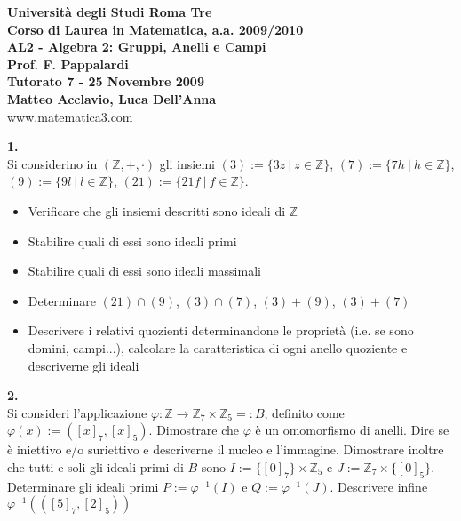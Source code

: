 \documentclass[italian,a4paper,11pt]
{article}
\newcommand{\Z}{\mathbb Z}
\newcommand{\acc}{\`}
\begin{document}
\begin{center}

\textbf{Universit\`a degli Studi Roma Tre}\\

\textbf{Corso di Laurea in Matematica, a.a. 2009/2010}\\

\textbf{AL2 - Algebra 2: Gruppi, Anelli e Campi}\\

\textbf{Prof. F. Pappalardi}\\

\textbf{Tutorato 7 - 25 Novembre 2009}\\

\textbf{Matteo Acclavio, Luca Dell'Anna}\\

www.matematica3.com\\
\end{center}



\vspace{0.4cm}

\vspace{0.4 cm}
\noindent
\begin{Ex}\textbf{ 1.}\\
Si considerino in $(\Z,+,\cdot)$ gli insiemi $(3):=\{3z \ | \ z\in\Z\}$, $(7):=\{7h \ | \ h\in\Z\}$, $(9):=\{9l \ | \ l\in\Z\}$, $(21):=\{21f \ | \ f\in\Z\}$. 
\begin{itemize}
\item  Verificare che gli insiemi descritti sono ideali di $\Z$
\item Stabilire quali di essi sono ideali primi
\item Stabilire quali di essi sono ideali massimali
\item Determinare $(21)\cap(9)$, $(3)\cap(7)$, $(3)+(9)$, $(3)+(7)$
\item Descrivere i relativi quozienti determinandone le propriet\acc a (i.e. se sono domini, campi...), calcolare la caratteristica di ogni anello quoziente e descriverne gli ideali
\end{itemize}
\end{Ex}

\vspace{0.4 cm}
\noindent
\begin{Ex}\textbf{ 2.}\\
Si consideri l'applicazione $\varphi:\Z\longrightarrow \Z_7\times\Z_5=:B$,  definito come $\varphi(x):=([x]_7,[x]_5)$. Dimostrare che $\varphi$ \acc e un omomorfismo di anelli. Dire se \acc e iniettivo e/o suriettivo e descriverne il nucleo e l'immagine. Dimostrare inoltre che tutti e soli gli ideali primi di $B$ sono $I:=\{[0]_7\}\times \Z_5$ e $J:=\Z_7\times\{[0]_5\}$. Determinare gli ideali primi $P:=\varphi^{-1}(I)$ e $Q:=\varphi^{-1}(J)$. Descrivere infine $\varphi^{-1}(([5]_7,[2]_5))$
\end{Ex}
\end{document}
